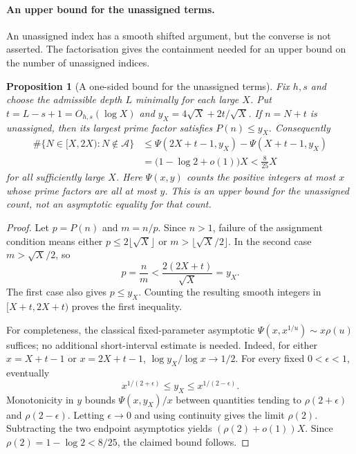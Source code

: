 \documentclass[11pt]{article}
\theoremstyle{plain}
\newtheorem{prop}[thm]{Proposition}
\theoremstyle{definition}
\theoremstyle{remark}
\begin{document}
\paragraph{An upper bound for the unassigned terms.}
An unassigned index has a smooth shifted argument, but the converse is
not asserted. The factorisation gives the containment needed for an upper
bound on the number of unassigned indices.

\begin{prop}[A one-sided bound for the unassigned terms]\label{prop:dickman}
Fix $h,s$ and choose the admissible depth $L$ minimally for each large $X$.
Put $t=L-s+1=O_{h,s}(\log X)$ and $y_X=4\sqrt X+2t/\sqrt X$.
If $n=N+t$ is unassigned, then its largest prime factor satisfies
$P(n)\le y_X$. Consequently
\[
\begin{aligned}
 \#\{N\in[X,2X):N\notin\mathcal A\}
 &\le \Psi(2X+t-1,y_X)-\Psi(X+t-1,y_X)\\
 &=\bigl(1-\log2+o(1)\bigr)X<\tfrac8{25}X
\end{aligned}
\]
for all sufficiently large $X$. Here $\Psi(x,y)$ counts the positive
integers at most $x$ whose prime factors are all at most $y$.
This is an upper bound for the unassigned count, not an asymptotic equality
for that count.
\end{prop}

\begin{proof}
Let $p=P(n)$ and $m=n/p$. Since $n>1$, failure of the assignment condition
means either $p\le2\lfloor\sqrt X\rfloor$ or
$m>\lfloor\sqrt X/2\rfloor$. In the second case $m>\sqrt X/2$, so
\[
 p=\frac{n}{m}<\frac{2(2X+t)}{\sqrt X}=y_X.
\]
The first case also gives $p\le y_X$. Counting the resulting smooth
integers in $[X+t,2X+t)$ proves the first inequality.

For completeness, the classical fixed-parameter asymptotic
$\Psi(x,x^{1/u})\sim x\rho(u)$ suffices; no additional short-interval
estimate is needed. Indeed, for either $x=X+t-1$ or $x=2X+t-1$,
$\log y_X/\log x\to1/2$. For every fixed $0<\epsilon<1$, eventually
\[
 x^{1/(2+\epsilon)}\le y_X\le x^{1/(2-\epsilon)}.
\]
Monotonicity in $y$ bounds $\Psi(x,y_X)/x$ between quantities tending to
$\rho(2+\epsilon)$ and $\rho(2-\epsilon)$. Letting $\epsilon\to0$ and
using continuity gives the limit $\rho(2)$. Subtracting the two endpoint
asymptotics yields $(\rho(2)+o(1))X$. Since $\rho(2)=1-\log2<8/25$,
the claimed bound follows.
\end{proof}
\end{document}
